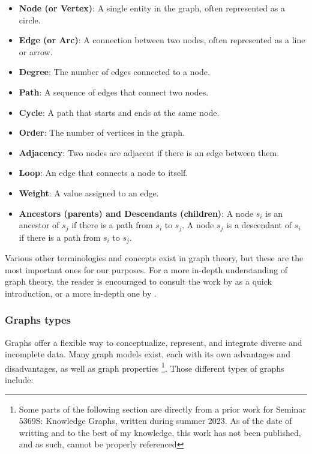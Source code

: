     \begin{itemize}
        \item \textbf{Node (or Vertex)}: A single entity in the graph, often represented as a circle.
        \item \textbf{Edge (or Arc)}: A connection between two nodes, often represented as a line or arrow.
        \item \textbf{Degree}: The number of edges connected to a node.
        \item \textbf{Path}: A sequence of edges that connect two nodes.
        \item \textbf{Cycle}: A path that starts and ends at the same node.
        \item \textbf{Order}: The number of vertices in the graph.
        \item \textbf{Adjacency}: Two nodes are adjacent if there is an edge between them.
        \item \textbf{Loop}: An edge that connects a node to itself.
        \item \textbf{Weight}: A value assigned to an edge.
        \item \textbf{Ancestors (parents) and Descendants (children)}: A node \(s_i\) is an ancestor of \(s_j\) if there is a path from \(s_i\) to \(s_j\). A node \(s_j\) is a descendant of \(s_i\) if there is a path from \(s_i\) to \(s_j\).
    \end{itemize}
    
    Various other terminologies and concepts exist in graph theory, but these are the most important ones for our purposes. For a more in-depth understanding of graph theory, the reader is encouraged to consult the work by \citeauthor{GraphTheorySolnon} as a quick introduction, \cite{GraphTheorySolnon} or a more in-depth one by \citeauthor{GraphTheoryIntro01} \cite{GraphTheoryIntro01}.

    \subsubsection{Graphs types}
    Graphs offer a flexible way to conceptualize, represent, and integrate diverse and incomplete data. Many graph models exist, each with its own advantages and disadvantages, as well as graph properties \footnote{Some parts of the following section are directly from a prior work for Seminar 5369S: Knowledge Graphs, written during summer 2023. As of the date of writting and to the best of my knowledge, this work has not been published, and as such, cannot be properly referenced}. Those different types of graphs include:

